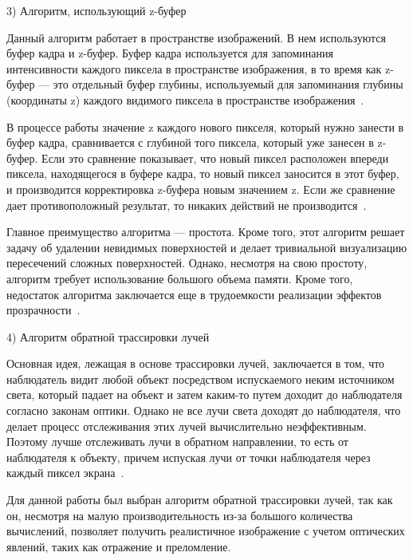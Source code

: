 3) Алгоритм, использующий z-буфер

Данный алгоритм работает в пространстве изображений. В нем
используются буфер кадра и z-буфер. Буфер кадра используется для запоминания
интенсивности каждого пиксела в пространстве изображения, в то время как z-
буфер — это отдельный буфер глубины, используемый для запоминания глубины
(координаты z) каждого видимого пиксела в пространстве изображения~\cite{rojers}.

В процессе работы значение z каждого нового пикселя, который нужно
занести в буфер кадра, сравнивается с глубиной того пиксела, который уже занесен
в z-буфер. Если это сравнение показывает, что новый пиксел расположен впереди
пиксела, находящегося в буфере кадра, то новый пиксел заносится в этот буфер, и
производится корректировка z-буфера новым значением z. Если же сравнение дает
противоположный результат, то никаких действий не производится~\cite{rojers}.

Главное преимущество алгоритма --- простота. Кроме того, этот алгоритм
решает задачу об удалении невидимых поверхностей и делает тривиальной
визуализацию пересечений сложных поверхностей. Однако, несмотря на свою
простоту, алгоритм требует использование большого объема памяти. Кроме того,
недостаток алгоритма заключается еще в трудоемкости реализации эффектов
прозрачности~\cite{rojers}.

4) Алгоритм обратной трассировки лучей

Основная идея, лежащая в основе трассировки лучей, заключается в том, что
наблюдатель видит любой объект посредством испускаемого неким источником
света, который падает на объект и затем каким-то путем доходит до наблюдателя
согласно законам оптики. Однако не все лучи света доходят до наблюдателя, что
делает процесс отслеживания этих лучей вычислительно неэффективным.
Поэтому лучше отслеживать лучи в обратном направлении, то есть от наблюдателя
к объекту, причем испуская лучи от точки наблюдателя через каждый пиксел
экрана~\cite{raytracing}.

Для данной работы был выбран алгоритм обратной трассировки лучей, так
как он, несмотря на малую производительность из-за большого количества
вычислений, позволяет получить реалистичное изображение с учетом оптических
явлений, таких как отражение и преломление.



